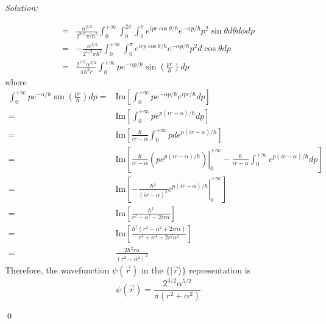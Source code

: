 \documentclass[12pt,a4paper]{article}
\newenvironment{sol}
    {\emph{Solution:}
    }
    {
    \qed
    }
\begin{document}
\begin{sol}
\begin{align}
\nonumber=&\frac{\alpha^{3/2}}{2^{3/2}\pi^2\hbar^3}\int_0^{+\infty}\int_0^{2\pi}\int_0^{\pi}e^{ipr\cos\theta/\hbar}e^{-\alpha p/\hbar}p^2\sin\theta d\theta d\phi dp\\
\nonumber=&-\frac{\alpha^{3/2}}{2^{1/2}\pi\hbar^3}\int_0^{+\infty}\int_0^{\pi}e^{irp\cos\theta/\hbar}e^{-\alpha p/\hbar}p^2d\cos\theta dp\\
\nonumber=&\frac{2^{1/2}\alpha^{3/2}}{\pi\hbar^2r}\int_0^{+\infty}pe^{-\alpha p/\hbar}\sin\left(\frac{pr}{\hbar}\right)dp
\end{align}
where
\begin{align}
\nonumber\int_0^{+\infty}pe^{-\alpha/\hbar}\sin\left(\frac{pr}{\hbar}\right)dp=&\text{Im}\left[\int_0^{+\infty}pe^{-\alpha p/\hbar}e^{ipr/\hbar}dp\right]\\
\nonumber=&\text{Im}\left[\int_0^{+\infty}pe^{p(ir-\alpha)/\hbar}dp\right]\\
\nonumber=&\text{Im}\left[\frac{\hbar}{ir-\alpha}\int_0^{+\infty}pde^{p(ir-\alpha)/\hbar}\right]\\
\nonumber=&\text{Im}\left[\frac{\hbar}{ir-\alpha}\left.\left(pe^{p(ir-\alpha)/\hbar}\right)\right|_0^{+\infty}-\frac{\hbar}{ir-\alpha}\int_0^{+\infty}e^{p(ir-\alpha)/\hbar}dp\right]\\
\nonumber=&\text{Im}\left[\left.-\frac{\hbar^2}{(ir-\alpha)^2}e^{p(ir-\alpha)/\hbar}\right|_0^{+\infty}\right]\\
\nonumber=&\text{Im}\left[\frac{\hbar^2}{r^2-\alpha^2-2ir\alpha}\right]\\
\nonumber=&\text{Im}\left[\frac{\hbar^2(r^2-\alpha^2+2ir\alpha)}{r^4+\alpha^4+2r^2\alpha^2}\right]\\
=&\frac{2\hbar^2r\alpha}{(r^2+\alpha^2)^2}
\end{align}
Therefore, the wavefunction $\psi(\vec{r})$ in the $\{|\vec{r}\rangle\}$ representation is
\begin{equation}
\psi(\vec{r})=\frac{2^{3/2}\alpha^{5/2}}{\pi(r^2+\alpha^2)}
\end{equation}
\end{sol}
\end{document}
